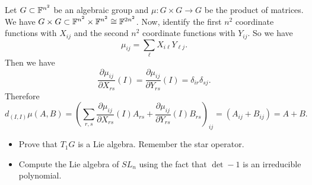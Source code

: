 \begin{itemize}
  \begin{example}
    Let $G\subset \mathbb{F}^{n^2}$ be an algebraic group and $\mu:G\times G\to G$ be the product of matrices. 
    We have $G\times G\subset \mathbb{F}^{n^2}\times\mathbb{F}^{n^2}\cong \mathbb{F}^{2n^2}$. Now, identify the
    first $n^2$ coordinate functions with $X_{ij}$ and the second $n^2$ coordinate functions with $Y_{ij}$. So we have 
    \begin{equation}
        \mu_{ij} = \sum_\ell X_{i\ell}Y_{\ell j}.
    \end{equation} 
    Then we have 
    \begin{equation}
        \frac{\partial \mu_{ij}}{\partial X_{rs}}(I) = \frac{\partial \mu_{ij}}{\partial Y_{rs}}(I) =\delta_{ir}\delta_{sj}.
    \end{equation}
    Therefore 
    \begin{equation}
        d_{(I,I)}\mu(A,B) = (\sum_{r,s} \frac{\partial \mu_{ij}}{\partial X_{rs}}(I)A_{rs}+
          \frac{\partial \mu_{ij}}{\partial Y_{rs}}(I)B_{rs}  )_{ij} = (A_{ij} + B_{ij}) = A+B.
    \end{equation}
  \end{example}
  \begin{center}
    \TODO 
    \begin{itemize}
        \item[1.] Prove that $T_1G$ is a Lie algebra. Remember the star operator.
        \item[2.]  Compute the Lie algebra of $SL_n$ using the fact that $\det-1$ is an irreducible polynomial.
    \end{itemize}
  \end{center}
\end{itemize}
 

